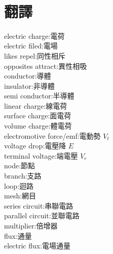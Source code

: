 \documentclass[a4paper,10pt,twocolumn,oneside]{article}
\begin{document}
\begin{small}
\\
\section{翻譯}
electric charge:電荷 \\
electric filed:電場 \\
likes repel:同性相斥 \\
opposites attract:異性相吸 \\
conductor:導體 \\
insulator:非導體 \\
semi conductor:半導體 \\
linear charge:線電荷 \\
surface charge:面電荷 \\
volume charge:體電荷 \\
electromotive force/emf:電動勢  $ V_{t} $\\
voltage drop:電壓降 $E$\\
terminal voltage:端電壓 $ V_{r} $\\ 
node:節點 \\
branch:支路 \\
loop:迴路 \\
mesh:網目 \\
series circuit:串聯電路 \\
parallel circuit:並聯電路 \\
multiplier:倍增器 \\
flux:通量 \\
electric flux:電場通量



\end{small}
\end{document}

